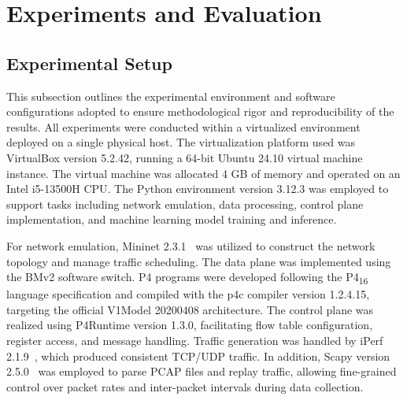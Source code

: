 \section{Experiments and Evaluation}
\label{sec4}

\subsection{Experimental Setup}

\noindent This subsection outlines the experimental environment and software configurations adopted to ensure methodological rigor and reproducibility of the results. 
All experiments were conducted within a virtualized environment deployed on a single physical host. 
The virtualization platform used was VirtualBox version 5.2.42, running a 64-bit Ubuntu 24.10 virtual machine instance. 
The virtual machine was allocated 4 GB of memory and operated on an Intel i5-13500H CPU. 
The Python environment version 3.12.3 was employed to support tasks including network emulation, data processing, control plane implementation, and machine learning model training and inference.

For network emulation, Mininet 2.3.1~\cite{Mininet} was utilized to construct the network topology and manage traffic scheduling. 
The data plane was implemented using the BMv2 software switch. 
P4 programs were developed following the P4\textsubscript{16} language specification and compiled with the p4c compiler version 1.2.4.15, targeting the official V1Model 20200408 architecture. 
The control plane was realized using P4Runtime version 1.3.0, facilitating flow table configuration, register access, and message handling. 
Traffic generation was handled by iPerf 2.1.9~\cite{iPerf}, which produced consistent TCP/UDP traffic. 
In addition, Scapy version 2.5.0~\cite{SCAPY} was employed to parse PCAP files and replay traffic, allowing fine-grained control over packet rates and inter-packet intervals during data collection.


